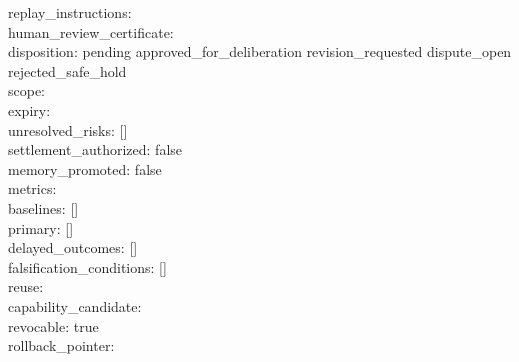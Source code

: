 replay\_\allowbreak{}instructions: \textquotesingle\textquotesingle{}\\
human\_\allowbreak{}review\_\allowbreak{}certificate:\\
disposition:
pending\textbar{}\allowbreak{} approved\_\allowbreak{}for\_\allowbreak{}deliberation\textbar{}\allowbreak{} revision\_\allowbreak{}requested\textbar{}\allowbreak{} dispute\_\allowbreak{}open\textbar{}\allowbreak{} rejected\_\allowbreak{}safe\_\allowbreak{}hold\\
scope: \textquotesingle\textquotesingle{}\\
expiry: \textquotesingle\textquotesingle{}\\
unresolved\_\allowbreak{}risks: {[}{]}\\
settlement\_\allowbreak{}authorized: false\\
memory\_\allowbreak{}promoted: false\\
metrics:\\
baselines: {[}{]}\\
primary: {[}{]}\\
delayed\_\allowbreak{}outcomes: {[}{]}\\
falsification\_\allowbreak{}conditions: {[}{]}\\
reuse:\\
capability\_\allowbreak{}candidate: \textquotesingle\textquotesingle{}\\
revocable: true\\
rollback\_\allowbreak{}pointer: \textquotesingle\textquotesingle{}
\par\endgroup

